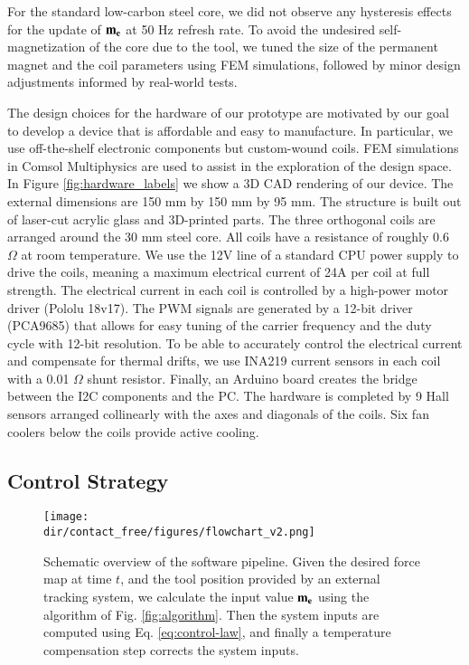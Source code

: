 For the standard low-carbon steel core, we did not observe any hysteresis effects for the update of $\mathbf{m_{e}}$ at 50 Hz refresh rate. To avoid the undesired self-magnetization of the core due to the tool, we tuned the size of the permanent magnet and the coil parameters using FEM simulations, followed by minor design adjustments informed by real-world tests.

The design choices for the hardware of our prototype are motivated by our goal to develop a device that is affordable and easy to manufacture. In particular, we use off-the-shelf electronic components but custom-wound coils. FEM simulations in Comsol Multiphysics are used to assist in the exploration of the design space. In Figure \ref{fig:hardware_labels} we show a 3D CAD rendering of our device. The external dimensions are 150 mm by 150 mm by 95 mm. The structure is built out of laser-cut acrylic glass and 3D-printed parts. The three orthogonal coils are arranged around the 30 mm steel core. All coils have a resistance of roughly 0.6 
$\Omega$ at room temperature. We use the 12V line of a standard CPU power supply to drive the coils, meaning a maximum electrical current of 24A per coil at full strength. The electrical current in each coil is controlled by a high-power motor driver (Pololu 18v17). The PWM signals are generated by a 12-bit driver (PCA9685) that allows for easy tuning of the carrier frequency and the duty cycle with 12-bit resolution. To be able to accurately control the electrical current and compensate for thermal drifts, we use INA219 current sensors in each coil with a 0.01 $\Omega$ shunt resistor. Finally, an Arduino board creates the bridge between the I2C components and the PC. The hardware is completed by 9 Hall sensors arranged collinearly with the axes and diagonals of the coils. Six fan coolers below the coils provide active cooling.

\subsection{Control Strategy}
\begin{figure}[!t]
\centering
\medskip
\texttt{[image: \\dir/contact\_free/figures/flowchart\_v2.png]}
\caption{Schematic overview of the software pipeline. Given the desired force map at time $t$, and the tool position provided by an external tracking system, we calculate the input value $\mathbf{m_{e}}$ using the algorithm of Fig. \ref{fig:algorithm}. Then the system inputs are computed using Eq. \ref{eq:control-law}, and finally a temperature compensation step corrects the system inputs.}
\label{fig:control}
\end{figure}

